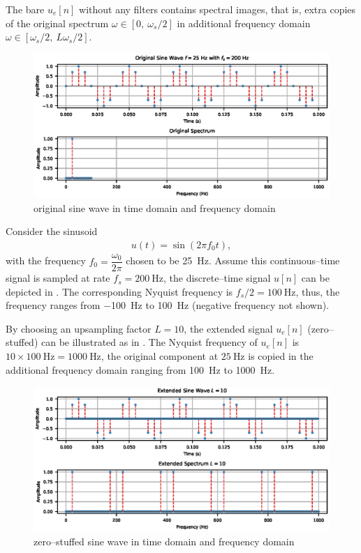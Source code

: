 The bare $u_e[n]$ without any filters contains spectral images, that is, extra copies of the original spectrum $\omega\in[0,~\omega_s/2]$ in additional frequency domain $\omega\in[\omega_s/2,~L\omega_s/2]$.
\begin{figure}[ht]
\centering
\includegraphics{PIC/PureSineOrigin}
\caption{original sine wave in time domain and frequency domain}\label{fig:original}
\end{figure}
Consider the sinusoid
\begin{gather}
u(t)=\sin\left(2\pi{}f_0t\right),
\end{gather}
with the frequency $f_0=\dfrac{\omega_0}{2\pi}$ chosen to be \SI{25}{\hertz}. Assume this continuous--time signal is sampled at rate $f_s=\SI{200}{\hertz}$, the discrete--time signal $u[n]$ can be depicted in . The corresponding Nyquist frequency is $f_s/2=\SI{100}{\hertz}$, thus, the frequency ranges from \SI{-100}{\hertz} to \SI{100}{\hertz} (negative frequency not shown).

By choosing an upsampling factor $L=10$, the extended signal $u_e[n]$ (zero--stuffed) can be illustrated as in . The Nyquist frequency of $u_e[n]$ is $10\times\SI{100}{\hertz}=\SI{1000}{\hertz}$, the original component at $\SI{25}{\hertz}$ is copied in the additional frequency domain ranging from \SI{100}{\hertz} to \SI{1000}{\hertz}.
\begin{figure}[ht]
\centering
\includegraphics{PIC/PureSineExtended}
\caption{zero--stuffed sine wave in time domain and frequency domain}\label{fig:extended}
\end{figure}

